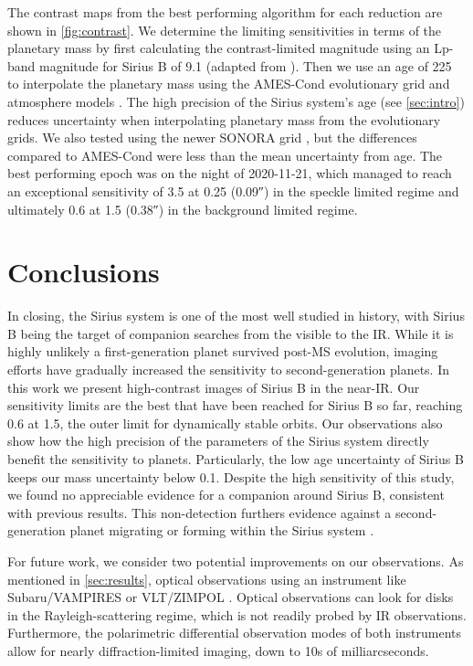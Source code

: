 \documentclass[twocolumn]{aastex631}
\begin{document}
The contrast maps from the best performing algorithm for each reduction are shown in \cref{fig:contrast}. We determine the limiting sensitivities in terms of the planetary mass by first calculating the contrast-limited magnitude using an Lp-band magnitude for Sirius B of 9.1 (adapted from \citealp{bonnet-bidaud_adonis_2008}). Then we use an age of \qty{225}{\mega\year} to interpolate the planetary mass using the AMES-Cond evolutionary grid and atmosphere models \citep{allard_models_2012}. The high precision of the Sirius system's age (see \cref{sec:intro}) reduces uncertainty when interpolating planetary mass from the evolutionary grids. We also tested using the newer SONORA grid \citep{marley_mark_2018_1309035,marley_sonora_2021}, but the differences compared to AMES-Cond were less than the mean uncertainty from age. The best performing epoch was on the night of 2020-11-21, which managed to reach an exceptional sensitivity of \qty{3.5}{\jupitermass} at \qty{0.25}{\au} (\ang{;;0.09}) in the speckle limited regime and ultimately \qty{0.6}{\jupitermass} at \qty{1.5}{\au} (\ang{;;0.38}) in the background limited regime.

\section{Conclusions} \label{sec:conclusion}

In closing, the Sirius system is one of the most well studied in history, with Sirius B being the target of companion searches from the visible to the IR. While it is highly unlikely a first-generation planet survived post-MS evolution, imaging efforts have gradually increased the sensitivity to second-generation planets. In this work we present high-contrast images of Sirius B in the near-IR. Our sensitivity limits are the best that have been reached for Sirius B so far, reaching \qty{0.6}{\jupitermass} at \qty{1.5}{\au}, the outer limit for dynamically stable orbits. Our observations also show how the high precision of the parameters of the Sirius system directly benefit the sensitivity to planets. Particularly, the low age uncertainty of Sirius B keeps our mass uncertainty below \qty{0.1}{\jupitermass}. Despite the high sensitivity of this study, we found no appreciable evidence for a companion around Sirius B, consistent with previous results. This non-detection furthers evidence against a second-generation planet migrating or forming within the Sirius system \citep{vigan_high-contrast_2015}.

For future work, we consider two potential improvements on our observations. As mentioned in \cref{sec:results}, optical observations using an instrument like Subaru/VAMPIRES \citep{norris_vampires_2014} or VLT/ZIMPOL \citep{schmid_zimpol_2018}. Optical observations can look for disks in the Rayleigh-scattering regime, which is not readily probed by IR observations. Furthermore, the polarimetric differential observation modes of both instruments allow for nearly diffraction-limited imaging, down to 10s of milliarcseconds.
\end{document}
